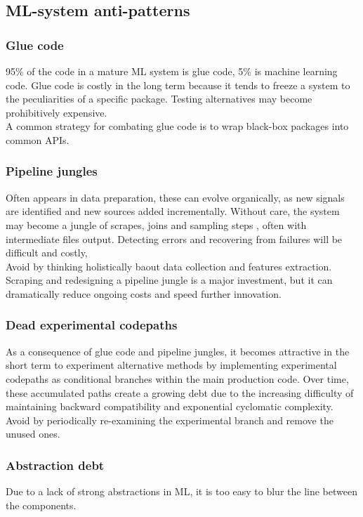 \documentclass[../main.tex]{subfiles}
\begin{document}
\subsection{ML-system anti-patterns}
\subsubsection{Glue code}
95\% of the code in a mature ML system is glue code, 5\% is machine learning code. Glue code is costly
in the long term because it tends to freeze a system to the peculiarities of a specific package. Testing
alternatives may become prohibitively expensive. \\
A common strategy for combating glue code is to wrap black-box packages into common APIs.

\subsubsection{Pipeline jungles}
Often appears in data preparation, these can evolve organically, as new signals are identified and new
sources added incrementally. Without care, the system may become a jungle of scrapes, joins and sampling steps
, often with intermediate files output. Detecting errors and recovering from failures will be difficult
and costly, \\
Avoid by thinking holistically baout data collection and features extraction. Scraping and redesigning
a pipeline jungle is a major investment, but it can dramatically reduce ongoing costs and speed further
innovation.

\subsubsection{Dead experimental codepaths}
As a consequence of glue code and pipeline jungles, it becomes attractive in the short term to
experiment alternative methods by implementing experimental codepaths as conditional branches within
the main production code. Over time, these accumulated paths create a growing debt due to the increasing
difficulty of maintaining backward compatibility and exponential cyclomatic complexity.\\
Avoid by periodically re-examining the experimental branch and remove the unused ones.

\subsubsection{Abstraction debt}
Due to a lack of strong abstractions in ML, it is too easy to blur the line between the components.
\end{document}
